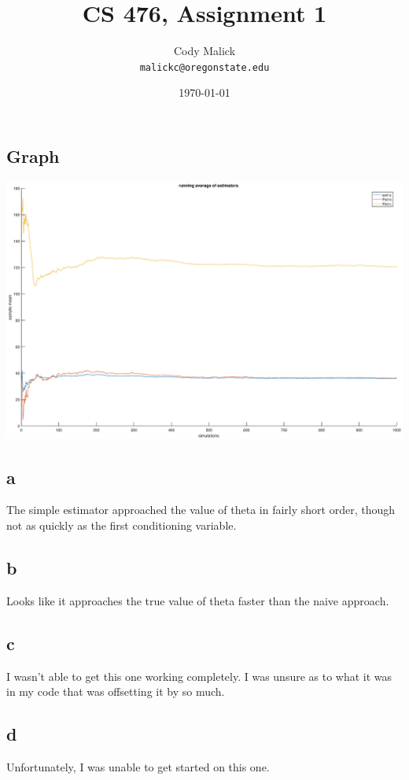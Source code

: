 \documentclass[10pt,letterpaper]{article}
\begin{document}
  \title{CS 476, Assignment 1}
  \author{Cody Malick\\
  \texttt{malickc@oregonstate.edu}}
  \date{\today}
  \maketitle

\section{}
\subsection*{Graph}
\includegraphics{assignment1.eps}
	\subsection*{a}
	The simple estimator approached the value of theta in fairly short order,
	though not as quickly as the first conditioning variable.
	\subsection*{b}
	Looks like it approaches the true value of theta faster than the 
	naive approach.
	\subsection*{c}
	I wasn't able to get this one working completely. I was unsure as to
	what it was in my code that was offsetting it by so much.
	\subsection*{d}
	Unfortunately, I was unable to get started on this one.

\section{}
	
\end{document}
